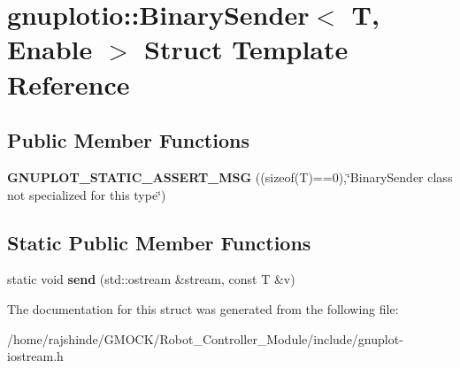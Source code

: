 \hypertarget{structgnuplotio_1_1_binary_sender}{}\section{gnuplotio\+:\+:Binary\+Sender$<$ T, Enable $>$ Struct Template Reference}
\label{structgnuplotio_1_1_binary_sender}
\subsection*{Public Member Functions}
\begin{DoxyCompactItemize}
\item 
{\bfseries G\+N\+U\+P\+L\+O\+T\+\_\+\+S\+T\+A\+T\+I\+C\+\_\+\+A\+S\+S\+E\+R\+T\+\_\+\+M\+SG} ((sizeof(T)==0),\char`\"{}Binary\+Sender class not specialized for this type\char`\"{})\hypertarget{structgnuplotio_1_1_binary_sender_a165c59a28adc4a90930925c6e0bfb0a9}{}\label{structgnuplotio_1_1_binary_sender_a165c59a28adc4a90930925c6e0bfb0a9}

\end{DoxyCompactItemize}
\subsection*{Static Public Member Functions}
\begin{DoxyCompactItemize}
\item 
static void {\bfseries send} (std\+::ostream \&stream, const T \&v)\hypertarget{structgnuplotio_1_1_binary_sender_a4b5dd22b7679c4f0ce4d8e75b36c8a21}{}\label{structgnuplotio_1_1_binary_sender_a4b5dd22b7679c4f0ce4d8e75b36c8a21}

\end{DoxyCompactItemize}


The documentation for this struct was generated from the following file\+:\begin{DoxyCompactItemize}
\item 
/home/rajshinde/\+G\+M\+O\+C\+K/\+Robot\+\_\+\+Controller\+\_\+\+Module/include/gnuplot-\/iostream.\+h\end{DoxyCompactItemize}
